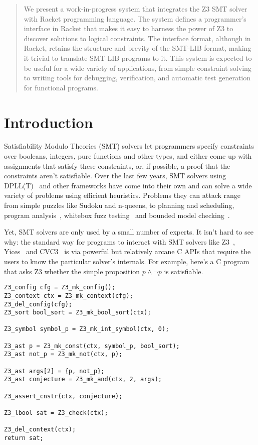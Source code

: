 \begin{abstract}
 We present a work-in-progress system that integrates the Z3 SMT solver with
 Racket programming language. The system defines a programmer's interface in
 Racket that makes it easy to harness the power of Z3 to discover solutions to
 logical constraints. The interface format, although in Racket, retains the
 structure and brevity of the SMT-LIB format, making it trivial to translate
 SMT-LIB programs to it. This system is expected to be useful for a wide variety
 of applications, from simple constraint solving to writing tools for debugging,
 verification, and automatic test generation for functional programs.
\end{abstract}

\section{Introduction}
\label{sec:motiv}

Satisfiability Modulo Theories (SMT) solvers let programmers specify constraints
over booleans, integers, pure functions and other types, and either come up
with assignments that satisfy these constraints, or, if possible, a proof that
the constraints aren't satisfiable. Over the last few years, SMT solvers using
DPLL(T)~\cite{dpllt:04} and other frameworks have come into their own and can
solve a wide variety of problems using efficient heuristics. Problems they can
attack range from simple puzzles like Sudoku and n-queens, to planning and
scheduling, program analysis~\cite{Gulwani:08}, whitebox fuzz
testing~\cite{Godefroid:08} and bounded model checking~\cite{Armando:09}.

Yet, SMT solvers are only used by a small number of experts. It isn't hard to
see why: the standard way for programs to interact with SMT solvers like
Z3~\cite{z3}, Yices~\cite{yices} and CVC3~\cite{cvc3} is via powerful but
relatively arcane C APIs that require the users to know the particular solver's
internals. For example, here's a C program that asks Z3 whether the simple
proposition $p \wedge \neg p$ is satisfiable.

\begin{verbatim}
Z3_config cfg = Z3_mk_config();
Z3_context ctx = Z3_mk_context(cfg);
Z3_del_config(cfg);
Z3_sort bool_sort = Z3_mk_bool_sort(ctx);

Z3_symbol symbol_p = Z3_mk_int_symbol(ctx, 0);

Z3_ast p = Z3_mk_const(ctx, symbol_p, bool_sort);
Z3_ast not_p = Z3_mk_not(ctx, p);

Z3_ast args[2] = {p, not_p};
Z3_ast conjecture = Z3_mk_and(ctx, 2, args);

Z3_assert_cnstr(ctx, conjecture);

Z3_lbool sat = Z3_check(ctx);

Z3_del_context(ctx);
return sat;
\end{verbatim}

